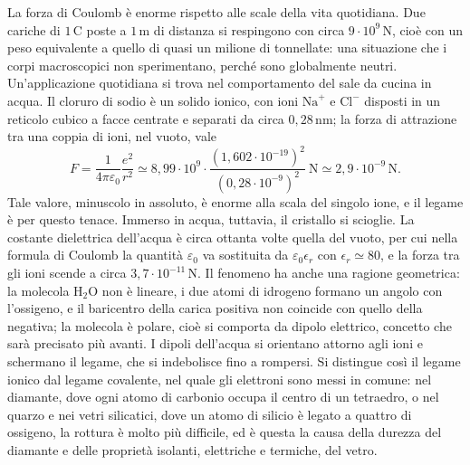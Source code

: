\documentclass[11pt,a4paper]{article}
\newcommand{\epz}{\varepsilon_0}
\begin{document}
La forza di Coulomb è enorme rispetto alle scale della vita quotidiana. Due cariche di $\ensuremath{1\,\mathrm{C}}$ poste a $\ensuremath{1\,\mathrm{m}}$ di distanza si respingono con circa $\ensuremath{9\cdot 10^{9}\,\mathrm{N}}$, cioè con un peso equivalente a quello di quasi un milione di tonnellate: una situazione che i corpi macroscopici non sperimentano, perché sono globalmente neutri. Un'applicazione quotidiana si trova nel comportamento del sale da cucina in acqua. Il cloruro di sodio è un solido ionico, con ioni $\mathrm{Na}^+$ e $\mathrm{Cl}^-$ disposti in un reticolo cubico a facce centrate e separati da circa $\ensuremath{0,28\,\mathrm{nm}}$; la forza di attrazione tra una coppia di ioni, nel vuoto, vale
\[
F=\frac{1}{4\pi\epz}\frac{e^2}{r^2}\simeq \ensuremath{8,99\cdot 10^{9}}\cdot\frac{(\ensuremath{1,602\cdot 10^{-19}})^2}{(\ensuremath{0,28\cdot 10^{-9}})^2}\ \ensuremath{\mathrm{N}}\simeq \ensuremath{2,9\cdot 10^{-9}\,\mathrm{N}}.
\]
Tale valore, minuscolo in assoluto, è enorme alla scala del singolo ione, e il legame è per questo tenace. Immerso in acqua, tuttavia, il cristallo si scioglie. La costante dielettrica dell'acqua è circa ottanta volte quella del vuoto, per cui nella formula di Coulomb la quantità $\epz$ va sostituita da $\epz\epsilon_r$ con $\epsilon_r\simeq 80$, e la forza tra gli ioni scende a circa $\ensuremath{3,7\cdot 10^{-11}\,\mathrm{N}}$. Il fenomeno ha anche una ragione geometrica: la molecola $\mathrm{H_2O}$ non è lineare, i due atomi di idrogeno formano un angolo con l'ossigeno, e il baricentro della carica positiva non coincide con quello della negativa; la molecola è polare, cioè si comporta da dipolo elettrico, concetto che sarà precisato più avanti. I dipoli dell'acqua si orientano attorno agli ioni e schermano il legame, che si indebolisce fino a rompersi. Si distingue così il legame ionico dal legame covalente, nel quale gli elettroni sono messi in comune: nel diamante, dove ogni atomo di carbonio occupa il centro di un tetraedro, o nel quarzo e nei vetri silicatici, dove un atomo di silicio è legato a quattro di ossigeno, la rottura è molto più difficile, ed è questa la causa della durezza del diamante e delle proprietà isolanti, elettriche e termiche, del vetro.
\end{document}
